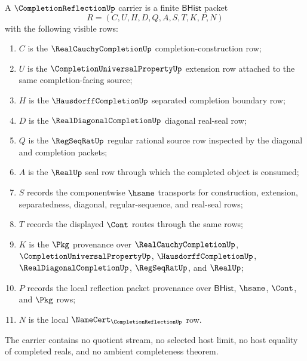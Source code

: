 \begin{definition}
\label{def:completion-reflection-carrier}
A $\CompletionReflectionUp$ carrier is a finite $\mathsf{BHist}$ packet
$$
R=(C,U,H,D,Q,A,S,T,K,P,N)
$$
with the following visible rows:
\begin{enumerate}
\item $C$ is the $\RealCauchyCompletionUp$ completion-construction row;
\item $U$ is the $\CompletionUniversalPropertyUp$ extension row attached to the same completion-facing source;
\item $H$ is the $\HausdorffCompletionUp$ separated completion boundary row;
\item $D$ is the $\RealDiagonalCompletionUp$ diagonal real-seal row;
\item $Q$ is the $\RegSeqRatUp$ regular rational source row inspected by the diagonal and completion packets;
\item $A$ is the $\RealUp$ seal row through which the completed object is consumed;
\item $S$ records the componentwise $\hsame$ transports for construction, extension, separatedness, diagonal, regular-sequence, and real-seal rows;
\item $T$ records the displayed $\Cont$ routes through the same rows;
\item $K$ is the $\Pkg$ provenance over $\RealCauchyCompletionUp$, $\CompletionUniversalPropertyUp$, $\HausdorffCompletionUp$, $\RealDiagonalCompletionUp$, $\RegSeqRatUp$, and $\RealUp$;
\item $P$ records the local reflection packet provenance over $\mathsf{BHist}$, $\hsame$, $\Cont$, and $\Pkg$ rows;
\item $N$ is the local $\NameCert_{\CompletionReflectionUp}$ row.
\end{enumerate}
The carrier contains no quotient stream, no selected host limit, no host equality of completed reals, and no ambient completeness theorem.
\end{definition}


